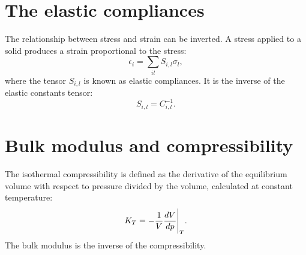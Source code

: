 \documentclass[12pt,a4paper]{article}
\begin{document}
%
%
\newpage
\section{\color{coral}The elastic compliances}
The relationship between stress and strain can be inverted. A stress 
applied to a solid produces a strain proportional to the stress:
\begin{equation}
\epsilon_{i} =\sum_{il} S_{i,l} \sigma_l, 
\end{equation}
where the tensor $S_{i,l}$ is known as elastic compliances. It is the
inverse of the elastic constants tensor: 
\begin{equation}
S_{i,l} = C_{i,l}^{-1}.
\end{equation}


\newpage
\section{\color{coral}Bulk modulus and compressibility}

The isothermal compressibility is defined as the derivative of the 
equilibrium volume with respect to pressure divided by the volume,
calculated at constant temperature:
\begin{equation}
K_T = - {1 \over V} {d V \over d p}\Bigg|_T.
\end{equation}
The bulk modulus is the inverse of the compressibility. 
\end{document}
